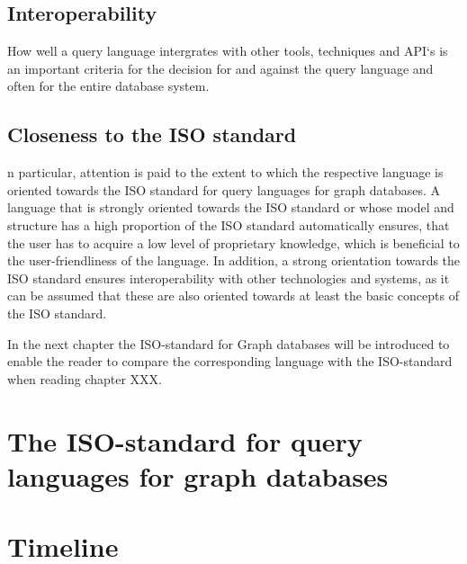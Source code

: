 \section{Interoperability}
How well a query language intergrates with other tools, techniques and API`s is an important
criteria for the decision for and against the query language and often for the entire 
database system.

\section*{Closeness to the ISO standard}
n particular, attention is paid to the extent to which the respective language is oriented 
towards the ISO standard for query languages for graph databases.
A language that is strongly oriented towards the ISO standard or whose model and structure 
has a high proportion of the ISO standard automatically ensures, 
that the user has to acquire a low level of proprietary knowledge, 
which is beneficial to the user-friendliness of the language.
In addition, a strong orientation towards the ISO standard ensures interoperability 
with other technologies and systems, 
as it can be assumed that these are also oriented towards at least the basic concepts of the ISO standard.

In the next chapter the ISO-standard for Graph databases will be introduced to enable the reader 
to compare the corresponding language with the ISO-standard when reading chapter XXX.

\chapter*{The ISO-standard for query languages for graph databases}




\chapter{Timeline}
\label{sec:intro:Timeline}


